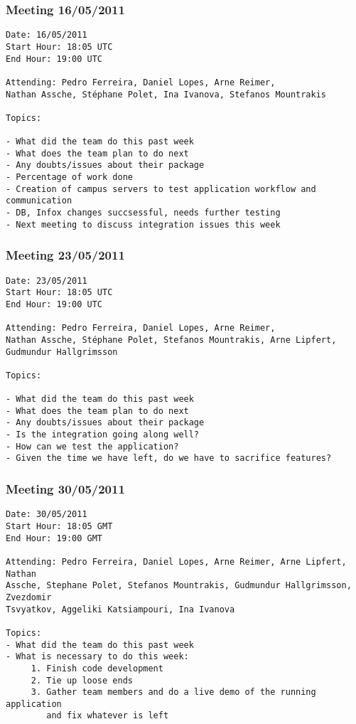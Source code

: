 \vspace{50px}
\subsubsection{Meeting 16/05/2011}
\normalsize
\begin{verbatim}
Date: 16/05/2011
Start Hour: 18:05 UTC
End Hour: 19:00 UTC

Attending: Pedro Ferreira, Daniel Lopes, Arne Reimer,
Nathan Assche, Stéphane Polet, Ina Ivanova, Stefanos Mountrakis

Topics:

- What did the team do this past week
- What does the team plan to do next
- Any doubts/issues about their package
- Percentage of work done
- Creation of campus servers to test application workflow and communication
- DB, Infox changes succsessful, needs further testing
- Next meeting to discuss integration issues this week
\end{verbatim}

\vspace{50px}
\subsubsection{Meeting 23/05/2011}
\normalsize
\begin{verbatim}
Date: 23/05/2011
Start Hour: 18:05 UTC
End Hour: 19:00 UTC

Attending: Pedro Ferreira, Daniel Lopes, Arne Reimer,
Nathan Assche, Stéphane Polet, Stefanos Mountrakis, Arne Lipfert, Gudmundur Hallgrimsson

Topics:

- What did the team do this past week
- What does the team plan to do next
- Any doubts/issues about their package
- Is the integration going along well?
- How can we test the application?
- Given the time we have left, do we have to sacrifice features?
\end{verbatim}

\vspace{50px}
\subsubsection{Meeting 30/05/2011}
\normalsize
\begin{verbatim}
Date: 30/05/2011
Start Hour: 18:05 GMT
End Hour: 19:00 GMT

Attending: Pedro Ferreira, Daniel Lopes, Arne Reimer, Arne Lipfert, Nathan
Assche, Stephane Polet, Stefanos Mountrakis, Gudmundur Hallgrimsson, Zvezdomir
Tsvyatkov, Aggeliki Katsiampouri, Ina Ivanova

Topics:
- What did the team do this past week
- What is necessary to do this week:
     1. Finish code development
     2. Tie up loose ends
     3. Gather team members and do a live demo of the running application 
     	and fix whatever is left
\end{verbatim}

